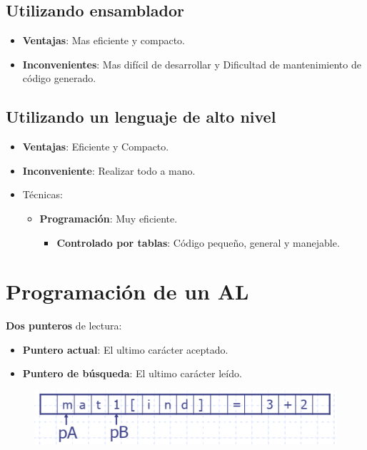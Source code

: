 \documentclass[12pt]{report} %
\begin{document}
\subsection{Utilizando ensamblador}

\begin{itemize}

\item
  \textbf{Ventajas}: Mas eficiente y compacto.
\item
  \textbf{Inconvenientes}: Mas difícil de desarrollar y Dificultad de
  mantenimiento de código generado.
\end{itemize}


\subsection{Utilizando un lenguaje de alto nivel}

\begin{itemize}
\item
  \textbf{Ventajas}: Eficiente y Compacto.
\item
  \textbf{Inconveniente}: Realizar todo a mano.
\item
  Técnicas:

  \begin{itemize}
  \item
    \textbf{Programación}: Muy eficiente.

    \begin{itemize}
    
    \item
      \textbf{Controlado por tablas}: Código pequeño, general y
      manejable.
    \end{itemize}
  \end{itemize}
\end{itemize}


\section{Programación de un AL}

\textbf{Dos punteros} de lectura:

\begin{itemize}
\item
  \textbf{Puntero actual}: El ultimo carácter aceptado.
\item
  \textbf{Puntero de búsqueda}: El ultimo carácter leído.
\end{itemize}

\begin{figure}[H]
	{\includegraphics[scale=.3]{Untitled 33.png}}
\end{figure}
\end{document}

